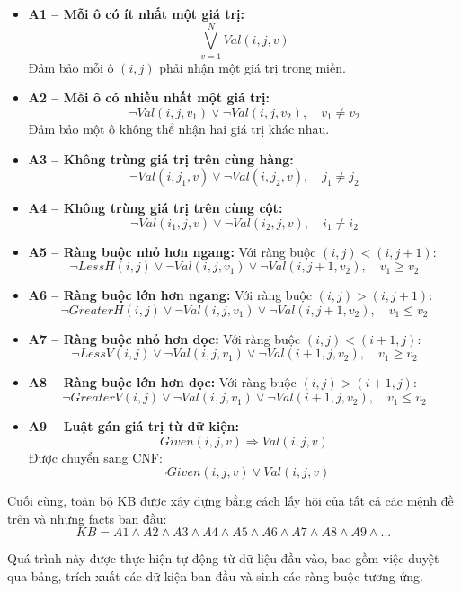 \begin{itemize}

    \item \textbf{A1 -- Mỗi ô có ít nhất một giá trị:}
    \[
    \bigvee_{v=1}^{N} Val(i,j,v)
    \]
    Đảm bảo mỗi ô $(i,j)$ phải nhận một giá trị trong miền.

    \item \textbf{A2 -- Mỗi ô có nhiều nhất một giá trị:}
    \[
    \neg Val(i,j,v_1) \lor \neg Val(i,j,v_2), \quad v_1 \neq v_2
    \]
    Đảm bảo một ô không thể nhận hai giá trị khác nhau.

    \item \textbf{A3 -- Không trùng giá trị trên cùng hàng:}
    \[
    \neg Val(i,j_1,v) \lor \neg Val(i,j_2,v), \quad j_1 \neq j_2
    \]

    \item \textbf{A4 -- Không trùng giá trị trên cùng cột:}
    \[
    \neg Val(i_1,j,v) \lor \neg Val(i_2,j,v), \quad i_1 \neq i_2
    \]

    \item \textbf{A5 -- Ràng buộc nhỏ hơn ngang:}
    Với ràng buộc $(i,j) < (i,j+1)$:
    \[
    \neg LessH(i,j) \lor \neg Val(i,j,v_1) \lor \neg Val(i,j+1,v_2), \quad v_1 \ge v_2
    \]

    \item \textbf{A6 -- Ràng buộc lớn hơn ngang:}
    Với ràng buộc $(i,j) > (i,j+1)$:
    \[
    \neg GreaterH(i,j) \lor \neg Val(i,j,v_1) \lor \neg Val(i,j+1,v_2), \quad v_1 \le v_2
    \]

    \item \textbf{A7 -- Ràng buộc nhỏ hơn dọc:}
    Với ràng buộc $(i,j) < (i+1,j)$:
    \[
    \neg LessV(i,j) \lor \neg Val(i,j,v_1) \lor \neg Val(i+1,j,v_2), \quad v_1 \ge v_2
    \]

    \item \textbf{A8 -- Ràng buộc lớn hơn dọc:}
    Với ràng buộc $(i,j) > (i+1,j)$:
    \[
    \neg GreaterV(i,j) \lor \neg Val(i,j,v_1) \lor \neg Val(i+1,j,v_2), \quad v_1 \le v_2
    \]

    \item \textbf{A9 -- Luật gán giá trị từ dữ kiện:}
    \[
    Given(i,j,v) \Rightarrow Val(i,j,v)
    \]
    Được chuyển sang CNF:
    \[
    \neg Given(i,j,v) \lor Val(i,j,v)
    \]

\end{itemize}

Cuối cùng, toàn bộ KB được xây dựng bằng cách lấy hội của tất cả các mệnh đề trên và những facts ban đầu:
\[
KB = A1 \wedge A2 \wedge A3 \wedge A4 \wedge A5 \wedge A6 \wedge A7 \wedge A8 \wedge A9 \wedge ...
\]

Quá trình này được thực hiện tự động từ dữ liệu đầu vào, bao gồm việc duyệt qua bảng, trích xuất các dữ kiện ban đầu và sinh các ràng buộc tương ứng.
